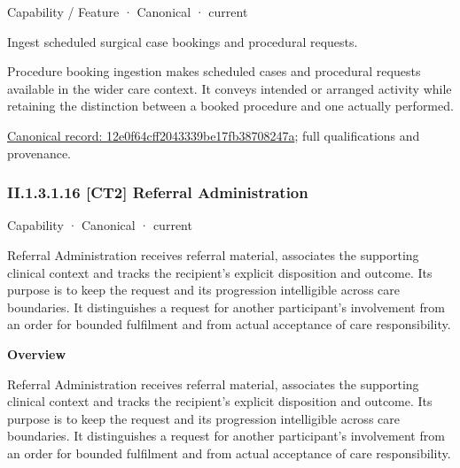 \label{element:12e0f64cff2043339be17fb38708247a}
{\small Capability / Feature · Canonical · current}\par

Ingest scheduled surgical case bookings and procedural requests.



Procedure booking ingestion makes scheduled cases and procedural requests available in the wider care context. It conveys intended or arranged activity while retaining the distinction between a booked procedure and one actually performed.


{\footnotesize \href{../../../../continuum/strategy/capability/feature/12e0f64cff2043339be17fb38708247a.md}{Canonical record: 12e0f64cff2043339be17fb38708247a}; full qualifications and provenance.}\par
\subsubsection*{II.1.3.1.16 [CT2] Referral Administration}
\label{navigation:II.1.3.1.16}

\label{element:ae0de25600ee416aa24d2a167b64f230}
{\small Capability · Canonical · current}\par

Referral Administration receives referral material, associates the supporting clinical context and tracks the recipient's explicit disposition and outcome. Its purpose is to keep the request and its progression intelligible across care boundaries. It distinguishes a request for another participant's involvement from an order for bounded fulfilment and from actual acceptance of care responsibility.



\textbf{Overview}



Referral Administration receives referral material, associates the supporting clinical context and tracks the recipient's explicit disposition and outcome. Its purpose is to keep the request and its progression intelligible across care boundaries. It distinguishes a request for another participant's involvement from an order for bounded fulfilment and from actual acceptance of care responsibility.



